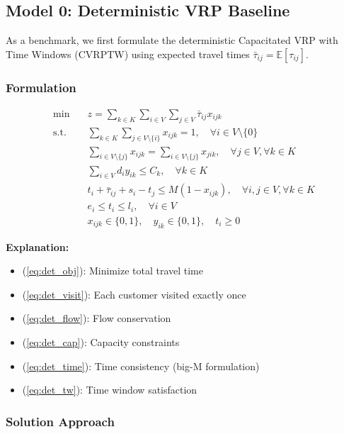 \subsection{Model 0: Deterministic VRP Baseline}

As a benchmark, we first formulate the deterministic Capacitated VRP with Time Windows (CVRPTW) using expected travel times $\bar{\tau}_{ij} = \mathbb{E}[\tau_{ij}]$.

\subsubsection{Formulation}

\begin{align}
\min \quad & z = \sum_{k \in K} \sum_{i \in V} \sum_{j \in V} \bar{\tau}_{ij} x_{ijk} \label{eq:det_obj} \\
\text{s.t.} \quad & \sum_{k \in K} \sum_{j \in V \setminus \{i\}} x_{ijk} = 1, \quad \forall i \in V \setminus \{0\} \label{eq:det_visit} \\
& \sum_{i \in V \setminus \{j\}} x_{ijk} = \sum_{i \in V \setminus \{j\}} x_{jik}, \quad \forall j \in V, \forall k \in K \label{eq:det_flow} \\
& \sum_{i \in V} d_i y_{ik} \leq C_k, \quad \forall k \in K \label{eq:det_cap} \\
& t_i + \bar{\tau}_{ij} + s_i - t_j \leq M(1 - x_{ijk}), \quad \forall i,j \in V, \forall k \in K \label{eq:det_time} \\
& e_i \leq t_i \leq l_i, \quad \forall i \in V \label{eq:det_tw} \\
& x_{ijk} \in \{0,1\}, \quad y_{ik} \in \{0,1\}, \quad t_i \geq 0 \label{eq:det_vars}
\end{align}

\textbf{Explanation:}
\begin{itemize}
\item (\ref{eq:det_obj}): Minimize total travel time
\item (\ref{eq:det_visit}): Each customer visited exactly once
\item (\ref{eq:det_flow}): Flow conservation
\item (\ref{eq:det_cap}): Capacity constraints
\item (\ref{eq:det_time}): Time consistency (big-M formulation)
\item (\ref{eq:det_tw}): Time window satisfaction
\end{itemize}

\subsubsection{Solution Approach}

